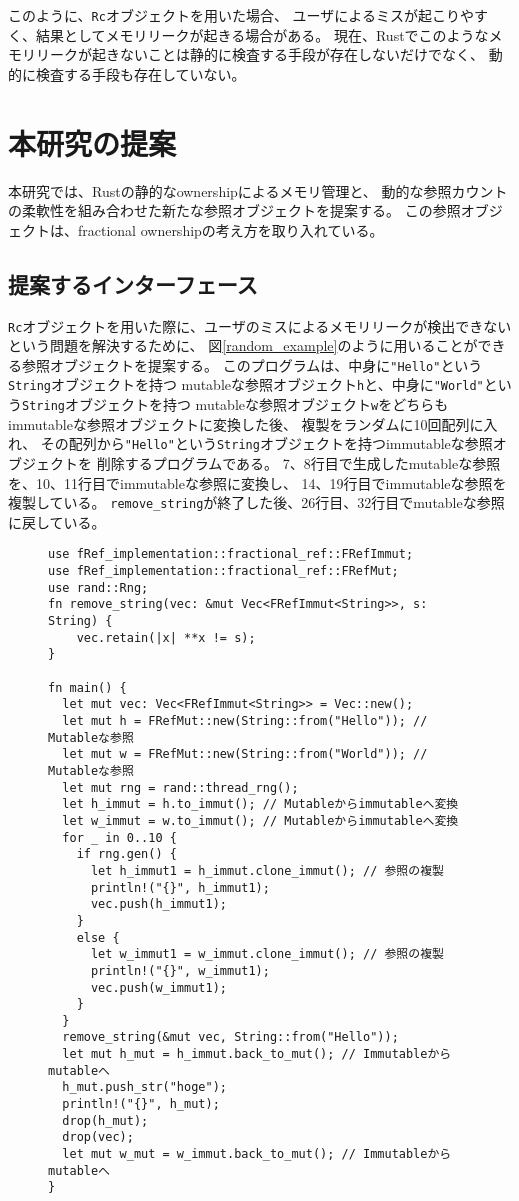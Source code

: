 \documentclass{sumiilab-paper}
\theoremstyle{mystyle}
\numberwithin{definition}{chapter} %
\begin{document}
このように、\texttt{Rc}オブジェクトを用いた場合、
ユーザによるミスが起こりやすく、結果としてメモリリークが起きる場合がある。
現在、Rustでこのようなメモリリークが起きないことは静的に検査する手段が存在しないだけでなく、
動的に検査する手段も存在していない。

\chapter{本研究の提案}
本研究では、Rustの静的なownershipによるメモリ管理と、
動的な参照カウントの柔軟性を組み合わせた新たな参照オブジェクトを提案する。
この参照オブジェクトは、fractional ownershipの考え方を取り入れている。

\section{提案するインターフェース}
\texttt{Rc}オブジェクトを用いた際に、ユーザのミスによるメモリリークが検出できない
という問題を解決するために、
図\ref{random_example}のように用いることができる参照オブジェクトを提案する。
このプログラムは、中身に\texttt{"Hello"}という\texttt{String}オブジェクトを持つ
mutableな参照オブジェクト\texttt{h}と、中身に\texttt{"World"}という\texttt{String}オブジェクトを持つ
mutableな参照オブジェクト\texttt{w}をどちらもimmutableな参照オブジェクトに変換した後、
複製をランダムに10回配列に入れ、
その配列から\texttt{"Hello"}という\texttt{String}オブジェクトを持つimmutableな参照オブジェクトを
削除するプログラムである。
7、8行目で生成したmutableな参照を、10、11行目でimmutableな参照に変換し、
14、19行目でimmutableな参照を複製している。
\texttt{remove\_string}が終了した後、26行目、32行目でmutableな参照に戻している。
\begin{figure}[htp]
\begin{lstlisting}[caption=新たな参照オブジェクトを用いた柔軟なメモリ管理の例, 
  label=random_example, captionpos=b]
use fRef_implementation::fractional_ref::FRefImmut;
use fRef_implementation::fractional_ref::FRefMut;
use rand::Rng;
fn remove_string(vec: &mut Vec<FRefImmut<String>>, s: String) {
    vec.retain(|x| **x != s);
}

fn main() {
  let mut vec: Vec<FRefImmut<String>> = Vec::new();
  let mut h = FRefMut::new(String::from("Hello")); // Mutableな参照
  let mut w = FRefMut::new(String::from("World")); // Mutableな参照
  let mut rng = rand::thread_rng();
  let h_immut = h.to_immut(); // Mutableからimmutableへ変換
  let w_immut = w.to_immut(); // Mutableからimmutableへ変換
  for _ in 0..10 {
    if rng.gen() {
      let h_immut1 = h_immut.clone_immut(); // 参照の複製
      println!("{}", h_immut1);
      vec.push(h_immut1);
    }
    else {
      let w_immut1 = w_immut.clone_immut(); // 参照の複製
      println!("{}", w_immut1);
      vec.push(w_immut1);
    }
  }
  remove_string(&mut vec, String::from("Hello"));
  let mut h_mut = h_immut.back_to_mut(); // Immutableからmutableへ
  h_mut.push_str("hoge");
  println!("{}", h_mut);
  drop(h_mut);
  drop(vec);
  let mut w_mut = w_immut.back_to_mut(); // Immutableからmutableへ
}
\end{lstlisting}
\end{figure}
\end{document}
